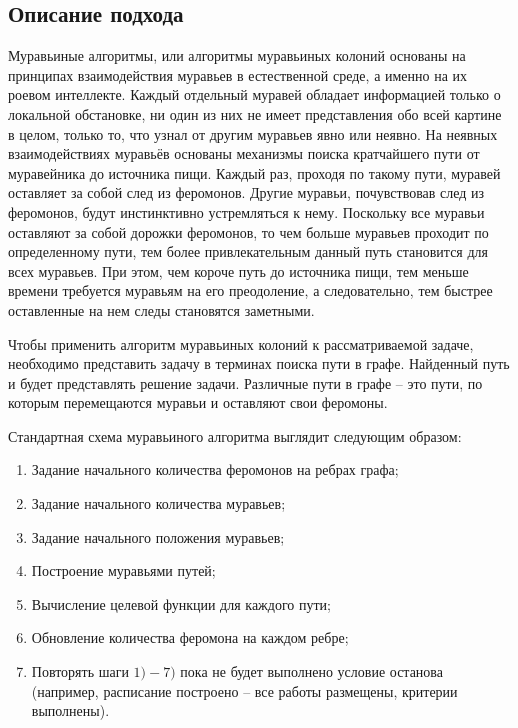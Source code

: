 \documentclass{article}
\begin{document}
\subsection{Описание подхода}
Муравьиные алгоритмы, или алгоритмы муравьиных колоний основаны на принципах взаимодействия муравьев в естественной среде, а именно на их роевом интеллекте. Каждый отдельный муравей обладает информацией только о локальной обстановке, ни один из них не имеет представления обо всей картине в целом,  только то, что узнал от другим муравьев явно или неявно. На неявных взаимодействиях муравьёв основаны механизмы поиска кратчайшего пути от муравейника до источника пищи. Каждый раз, проходя по такому пути, муравей оставляет за собой след из феромонов. Другие муравьи, почувствовав след из феромонов, будут инстинктивно устремляться к нему. Поскольку все муравьи оставляют за собой дорожки феромонов, то чем больше муравьев проходит по определенному пути, тем более привлекательным данный путь становится для всех муравьев. При этом, чем короче путь до источника пищи, тем меньше времени требуется муравьям на его преодоление, а следовательно, тем быстрее оставленные на нем следы становятся заметными. \par
Чтобы применить алгоритм муравьиных колоний к рассматриваемой задаче, необходимо представить задачу в терминах поиска пути в графе. Найденный путь и будет представлять решение задачи. Различные пути в графе – это пути, по которым перемещаются муравьи и оставляют свои феромоны. \par
Стандартная схема муравьиного алгоритма выглядит следующим образом:
\begin{enumerate}
  \item Задание начального количества феромонов на ребрах графа;
  \item Задание начального количества муравьев;
  \item Задание начального положения муравьев;
  \item Построение муравьями путей;
  \item Вычисление целевой функции для каждого пути;
  \item Обновление количества феромона на каждом ребре;
  \item Повторять шаги $1)-7)$ пока не будет выполнено условие останова (например, расписание построено – все работы размещены, критерии выполнены).
\end{enumerate}
\end{document}
